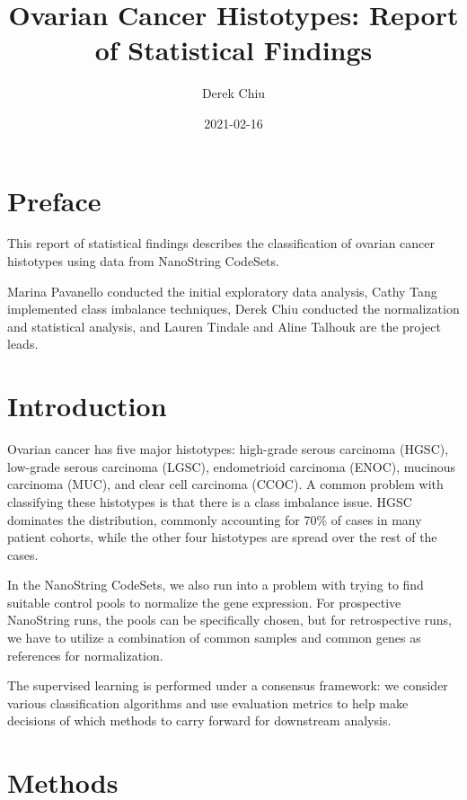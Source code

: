 \documentclass[
]{report}
\title{Ovarian Cancer Histotypes: Report of Statistical Findings}
\author{Derek Chiu}
\date{2021-02-16}
\begin{document}
\maketitle

{
\hypersetup{linkcolor=}
\setcounter{tocdepth}{1}
\tableofcontents
}
\listoftables
\listoffigures
\hypertarget{preface}{%
\chapter*{Preface}\label{preface}}

This report of statistical findings describes the classification of ovarian cancer histotypes using data from NanoString CodeSets.

Marina Pavanello conducted the initial exploratory data analysis, Cathy Tang implemented class imbalance techniques, Derek Chiu conducted the normalization and statistical analysis, and Lauren Tindale and Aline Talhouk are the project leads.

\hypertarget{introduction}{%
\chapter{Introduction}\label{introduction}}

Ovarian cancer has five major histotypes: high-grade serous carcinoma (HGSC), low-grade serous carcinoma (LGSC), endometrioid carcinoma (ENOC), mucinous carcinoma (MUC), and clear cell carcinoma (CCOC). A common problem with classifying these histotypes is that there is a class imbalance issue. HGSC dominates the distribution, commonly accounting for 70\% of cases in many patient cohorts, while the other four histotypes are spread over the rest of the cases.

In the NanoString CodeSets, we also run into a problem with trying to find suitable control pools to normalize the gene expression. For prospective NanoString runs, the pools can be specifically chosen, but for retrospective runs, we have to utilize a combination of common samples and common genes as references for normalization.

The supervised learning is performed under a consensus framework: we consider various classification algorithms and use evaluation metrics to help make decisions of which methods to carry forward for downstream analysis.

\hypertarget{methods}{%
\chapter{Methods}\label{methods}}
\end{document}
